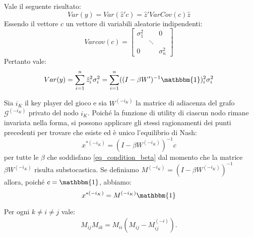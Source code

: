 \begin{alphaparts}
    \questionpart
    Vale il seguente risultato:
    \[
    Var(y) = Var(\hat{z}'c) = \hat{z}'VarCov(c)\hat{z}    
    \]
    Essendo il vettore \(c\) un vettore di variabili aleatorie indipendenti:
    \[
    Varcov(c) = \begin{bmatrix}
        \sigma_1^2 & & 0 \\
         & \ddots & \\
         0 & & \sigma_n^2
    \end{bmatrix}    
    \]
    Pertanto vale:
    \[Var(y) =  \sum \limits_{i = 1}^{n} \hat{z}_i^2 \sigma_i^2 =  \sum \limits_{i = 1}^{n} ((I - \beta W')^{-1}\mathbbm{1})_i^2 \sigma_i^2\]

    \questionpart
    Sia \(i_K\) il key player del gioco e sia \(W^{(- i_K)}\) la matrice di adiacenza del grafo \(\mathcal{G}^{(- i_K)}\) privato del nodo \(i_K\). Poiché la funzione di utility di ciascun nodo rimane invariata nella forma, si possono applicare gli stessi ragionamenti dei punti precedenti per trovare che esiste ed è unico l'equilibrio di Nash:
    \[
    x^{*(- i_K)} = (I- \beta W^{(- i_K)})^{- 1}c  
    \]
    per tutte le \(\beta\) che soddisfano \ref{eq_condition_beta} dal momento che la matrice \(\beta W^{(- i_K)}\) risulta substocastica. Se definiamo \(M^{(- i_K)} = (I- \beta W^{(- i_K)})^{- 1}\) allora, poiché \(c= \mathbbm{1}\), abbiamo: 
    \begin{equation}    
            x^{*(- i_K)} = M^{(- i_K)} \mathbbm{1}
    \end{equation}
    
    \questionpart
    Per ogni \(k \neq i \neq j\) vale:
    \begin{gather*}
        M_{ij}M_{ik} = M_{ii}(M_{ij}-M_{ij}^{(-i)}).
    \end{gather*}


\end{alphaparts}
